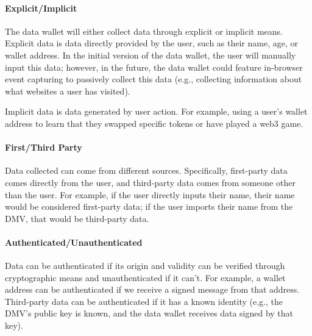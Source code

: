 \paragraph{Explicit/Implicit}
The data wallet will either collect data through explicit or implicit means. Explicit data is data directly provided by the user, such as their name, age, or wallet address. In the initial version of the data wallet, the user will manually input this data; however, in the future, the data wallet could feature in-browser event capturing to passively collect this data (e.g., collecting information about what websites a user has visited).


Implicit data is data generated by user action. For example, using a user's wallet address to learn that they swapped specific tokens or have played a web3 game. 


\paragraph{First/Third Party}
Data collected can come from different sources. Specifically, first-party data comes directly from the user, and third-party data comes from someone other than the user. For example, if the user directly inputs their name, their name would be considered first-party data; if the user imports their name from the DMV, that would be third-party data.


\paragraph{Authenticated/Unauthenticated}
Data can be authenticated if its origin and validity can be verified through cryptographic means and unauthenticated if it can't. For example, a wallet address can be authenticated if we receive a signed message from that address. Third-party data can be authenticated if it has a known identity (e.g., the DMV's public key is known, and the data wallet receives data signed by that key). 



